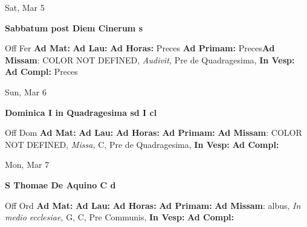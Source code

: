 \documentclass[10pt]{book}
\begin{document}
\begin{center}
\begin{minipage}{3.5in}
\vspace{2em}
\begin{center}Sat, Mar 5
\end{center}
\textbf{ \large Sabbatum post Diem Cinerum
\textnormal{\normalsize s}}

\begin{justify}Off Fer
\textbf{Ad Mat: }
\textbf{Ad Lau: }
\textbf{Ad Horas: }Preces
\textbf{Ad Primam: }Preces\textbf{Ad Missam}: COLOR NOT DEFINED, \textit{Audivit,} Pre de Quadragesima, 
\textbf{In Vesp: }
\textbf{Ad Compl: }Preces
\end{justify}
\end{minipage}
\end{center}

\begin{center}
\begin{minipage}{3.5in}
\vspace{2em}
\begin{center}Sun, Mar 6
\end{center}
\textbf{ \large Dominica I in Quadragesima
\textnormal{\normalsize sd I cl}}

\begin{justify}Off Dom
\textbf{Ad Mat: }
\textbf{Ad Lau: }
\textbf{Ad Horas: }
\textbf{Ad Primam: }\textbf{Ad Missam}: COLOR NOT DEFINED, \textit{Missa,} C, Pre de Quadragesima, 
\textbf{In Vesp: }
\textbf{Ad Compl: }
\end{justify}
\end{minipage}
\end{center}

\begin{center}
\begin{minipage}{3.5in}
\vspace{2em}
\begin{center}Mon, Mar 7
\end{center}
\textbf{ \large S Thomae De Aquino C
\textnormal{\normalsize d}}

\begin{justify}Off Ord
\textbf{Ad Mat: }
\textbf{Ad Lau: }
\textbf{Ad Horas: }
\textbf{Ad Primam: }\textbf{Ad Missam}: albus, \textit{In medio ecclesiae,} G, C, Pre Communis, 
\textbf{In Vesp: }
\textbf{Ad Compl: }
\end{justify}
\end{minipage}
\end{center}
\end{document}
